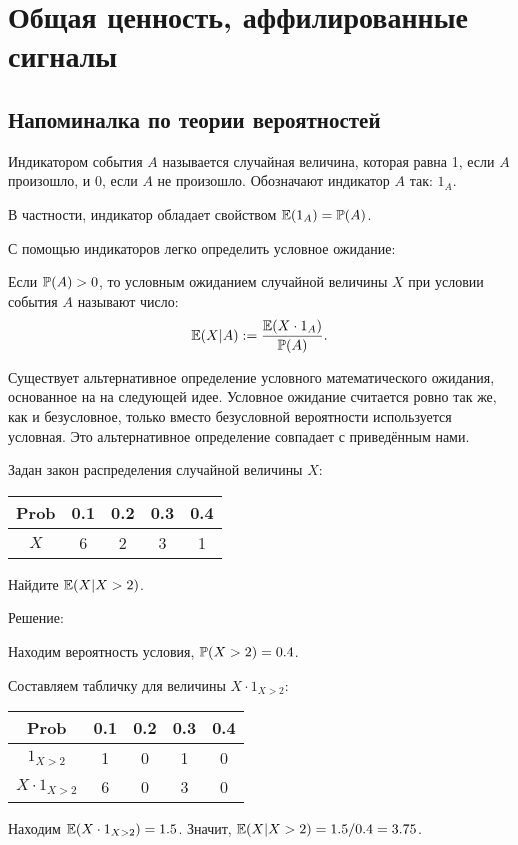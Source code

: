 \chapter{Общая ценность, аффилированные сигналы}


\section{Напоминалка по теории вероятностей}



\begin{mydef}
Индикатором события $ A $ называется случайная величина, которая равна 1, если $ A $ произошло, и 0, если $ A $ не произошло. Обозначают индикатор $ A $ так: $ 1_{A} $.
\end{mydef}

В частности, индикатор обладает свойством $ \E(1_{A})=\P(A) $.

С помощью индикаторов легко определить условное ожидание:

\begin{mydef}
Если $ \P(A)>0 $, то условным ожиданием случайной величины $ X $ при условии события $ A $ называют число:
\[
\E(X|A):=\frac{\E(X\cdot 1_{A})}{\P(A)}.
\]
\label{posit_condition}
\end{mydef}

Существует альтернативное определение условного математического ожидания, основанное на на следующей идее. Условное ожидание считается ровно так же, как и безусловное, только вместо безусловной вероятности используется условная. Это альтернативное определение совпадает с приведённым нами.

\begin{myex} Задан закон распределения случайной величины $X$:


\begin{tabular}{c|cccc}
Prob & 0.1 & 0.2 & 0.3 & 0.4 \\
\hline
$X$ & 6 & 2 & 3 & 1 \\
\end{tabular}

Найдите $ \E(X|X>2) $.

Решение:

Находим вероятность условия, $\P(X>2)=0.4$.

Составляем табличку для величины $ X\cdot 1_{X>2} $:

\begin{tabular}{c|cccc}
Prob & 0.1 & 0.2 & 0.3 & 0.4 \\
\hline
$1_{X>2}$ & 1 & 0 & 1 & 0 \\
$X\cdot 1_{X>2}$ & 6 & 0 & 3 & 0 \\
\end{tabular}

Находим $ \E(X\cdot 1_{X>2})=1.5 $. Значит, $ \E(X|X>2)=1.5/0.4=3.75$.

\end{myex}



